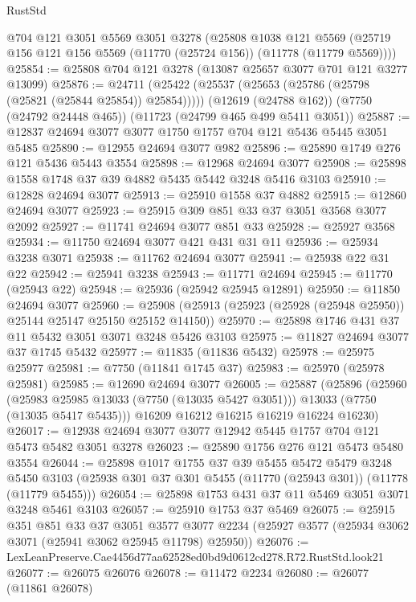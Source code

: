 \begin{lexlean}{RustStd}
\begin{coremodule}
    @704
    @121
    @3051
    @5569
    @3051
    @3278
    (@25808
      @1038
      @121
      @5569
      (@25719 @156 @121 @156 @5569 (@11770 (@25724 @156)) (@11778 (@11779 @5569))))
@25854 := @25808 @704 @121 @3278 (@13087 @25657 @3077 @701 @121 @3277 @13099)
@25876 := @24711
    (@25422 (@25537 (@25653 (@25786 (@25798 (@25821 (@25844 @25854)) @25854)))))
    (@12619 (@24788 @162))
    (@7750 (@24792 @24448 @465))
    (@11723 (@24799 @465 @499 @5411 @3051))
@25887 := @12837 @24694 @3077 @3077 @1750 @1757 @704 @121 @5436 @5445 @3051 @5485
@25890 := @12955 @24694 @3077 @982
@25896 := @25890 @1749 @276 @121 @5436 @5443 @3554
@25898 := @12968 @24694 @3077
@25908 := @25898 @1558 @1748 @37 @39 @4882 @5435 @5442 @3248 @5416 @3103
@25910 := @12828 @24694 @3077
@25913 := @25910 @1558 @37 @4882
@25915 := @12860 @24694 @3077
@25923 := @25915 @309 @851 @33 @37 @3051 @3568 @3077 @2092
@25927 := @11741 @24694 @3077 @851 @33
@25928 := @25927 @3568
@25934 := @11750 @24694 @3077 @421 @431 @31 @11
@25936 := @25934 @3238 @3071
@25938 := @11762 @24694 @3077
@25941 := @25938 @22 @31 @22
@25942 := @25941 @3238
@25943 := @11771 @24694
@25945 := @11770 (@25943 @22)
@25948 := @25936 (@25942 @25945 @12891)
@25950 := @11850 @24694 @3077
@25960 := @25908 (@25913 (@25923 (@25928 (@25948 @25950)) @25144 @25147 @25150 @25152 @14150))
@25970 := @25898 @1746 @431 @37 @11 @5432 @3051 @3071 @3248 @5426 @3103
@25975 := @11827 @24694 @3077 @37 @1745 @5432
@25977 := @11835 (@11836 @5432)
@25978 := @25975 @25977
@25981 := @7750 (@11841 @1745 @37)
@25983 := @25970 (@25978 @25981)
@25985 := @12690 @24694 @3077
@26005 := @25887
    (@25896
      (@25960
        (@25983 @25985 @13033 (@7750 (@13035 @5427 @3051)))
        @13033
        (@7750 (@13035 @5417 @5435)))
      @16209
      @16212
      @16215
      @16219
      @16224
      @16230)
@26017 := @12938 @24694 @3077 @3077 @12942 @5445 @1757 @704 @121 @5473 @5482 @3051 @3278
@26023 := @25890 @1756 @276 @121 @5473 @5480 @3554
@26044 := @25898
    @1017
    @1755
    @37
    @39
    @5455
    @5472
    @5479
    @3248
    @5450
    @3103
    (@25938 @301 @37 @301 @5455 (@11770 (@25943 @301)) (@11778 (@11779 @5455)))
@26054 := @25898 @1753 @431 @37 @11 @5469 @3051 @3071 @3248 @5461 @3103
@26057 := @25910 @1753 @37 @5469
@26075 := @25915
    @351
    @851
    @33
    @37
    @3051
    @3577
    @3077
    @2234
    (@25927 @3577 (@25934 @3062 @3071 (@25941 @3062 @25945 @11798) @25950))
@26076 := LexLeanPreserve.Cae4456d77aa62528ed0bd9d0612cd278.R72.RustStd.look21
@26077 := @26075 @26076
@26078 := @11472 @2234
@26080 := @26077 (@11861 @26078)

\end{coremodule}
\end{lexlean}
